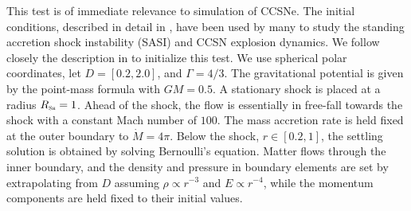 \documentclass[letterpaper]{jpconf}
\newcommand{\shock}{\textnormal{\tiny\textsc{Sh}}}
\begin{document}
This test is of immediate relevance to simulation of CCSNe.  
The initial conditions, described in detail in \cite{blondin_etal_2003}, have been used by many to study the standing accretion shock instability (SASI) and CCSN explosion dynamics.  
We follow closely the description in \cite{blondin_etal_2003} to initialize this test.  
We use spherical polar coordinates, let $D=[0.2,2.0]$, and $\Gamma=4/3$.  
The gravitational potential is given by the point-mass formula with $GM=0.5$.  
A stationary shock is placed at a radius $R_{\shock}=1$.  
Ahead of the shock, the flow is essentially in free-fall towards the shock with a constant Mach number of $100$.  
The mass accretion rate is held fixed at the outer boundary to $\dot{M}=4\pi$.  
Below the shock, $r\in[0.2,1]$, the settling solution is obtained by solving Bernoulli's equation.  
Matter flows through the inner boundary, and the density and pressure in boundary elements are set by extrapolating from $D$ assuming $\rho\propto r^{-3}$ and $E\propto r^{-4}$, while the momentum components are held fixed to their initial values.  
\end{document}
